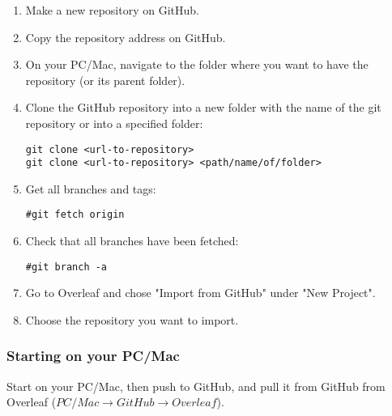 \documentclass{article}
\begin{document}
\begin{enumerate}
    \item Make a new repository on GitHub.
    \item Copy the repository address on GitHub.
    \item On your PC/Mac, navigate to the folder where you want to have the repository (or its parent folder).
    \item Clone the GitHub repository into a new folder with the name of the git repository or into a specified folder:
    \begin{verbatim}
git clone <url-to-repository>
git clone <url-to-repository> <path/name/of/folder>
    \end{verbatim}
    \item Get all branches and tags:
    \begin{verbatim}
#git fetch origin
    \end{verbatim}
    \item Check that all branches have been fetched:
    \begin{verbatim}
#git branch -a
    \end{verbatim}
    \item Go to Overleaf and chose "Import from GitHub" under "New Project".
    \item Choose the repository you want to import.
\end{enumerate}

\subsubsection{Starting on your PC/Mac}
Start on your PC/Mac, then push to GitHub, and pull it from GitHub from Overleaf
($PC/Mac \rightarrow GitHub \rightarrow Overleaf$).
\end{document}
